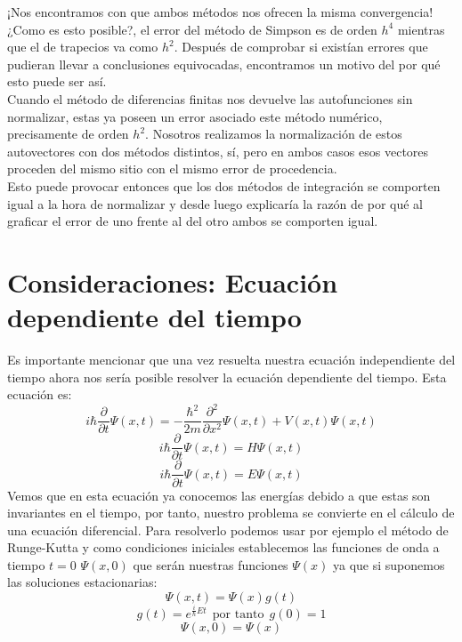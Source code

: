 \documentclass[12pt]{article}
\begin{document}
¡Nos encontramos con que ambos métodos nos ofrecen la misma convergencia! ¿Como es esto posible?, el error del método de Simpson es de orden $h^4$ mientras que el de trapecios va como $h^2$. Después de comprobar si existían errores que pudieran llevar a conclusiones equivocadas, encontramos un motivo del por qué esto puede ser así.\\

Cuando el método de diferencias finitas nos devuelve las autofunciones sin normalizar, estas ya poseen un error asociado  este método numérico, precisamente de orden $h^2$. Nosotros realizamos la normalización de estos autovectores con dos métodos distintos, sí, pero en ambos casos esos vectores proceden del mismo sitio con el mismo error de procedencia.\\

Esto puede provocar entonces que los dos métodos de integración se comporten igual a la hora de normalizar y desde luego explicaría la razón de por qué al graficar el error de uno frente al del otro ambos se comporten igual.
    
\section{Consideraciones: Ecuación dependiente del tiempo}

Es importante mencionar que una vez resuelta nuestra ecuación independiente del tiempo ahora nos sería posible resolver la ecuación dependiente del tiempo. Esta ecuación es:
\begin{equation}
    i\hbar \frac{\partial}{\partial t} \Psi(x, t) = -\frac{\hbar^2}{2m} \frac{\partial^2}{\partial x^2} \Psi(x, t) + V(x, t) \Psi(x, t)
\end{equation}
\begin{equation}
    i\hbar \frac{\partial}{\partial t} \Psi(x, t) = H \Psi(x, t)
\end{equation}
\begin{equation}
    i\hbar \frac{\partial}{\partial t} \Psi(x, t) = E \Psi(x, t)
\end{equation}
Vemos que en esta ecuación ya conocemos las energías debido a que estas son invariantes en el tiempo, por tanto, nuestro problema se convierte en el cálculo de una ecuación diferencial.
Para resolverlo podemos usar por ejemplo el método de Runge-Kutta y como condiciones iniciales establecemos las funciones de onda a tiempo $t=0$ $\Psi(x,0)$ que serán nuestras funciones $\Psi(x)$ ya que si suponemos las soluciones estacionarias:
\[
    \Psi(x,t)=\Psi(x)g(t)
    \]
\[
    g(t)=e^{\frac{i}{\hbar}Et} \:\: \text{por tanto}\:\: g(0)=1
\]
\[
    \Psi(x,0)=\Psi(x)
\]
\end{document}
